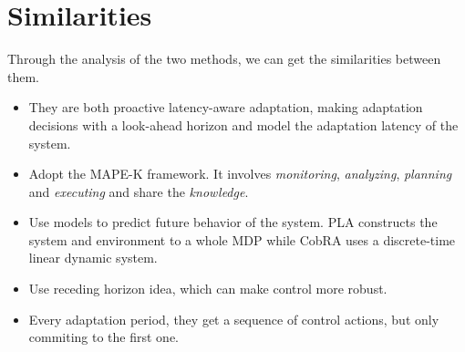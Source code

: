 \documentclass[sigconf]{acmart}
\begin{document}
\section{Similarities}
Through the analysis of the two methods, we can get the similarities between them. 
\begin{itemize}
	\item They are both proactive latency-aware adaptation, making adaptation decisions with a look-ahead horizon and model the adaptation latency of the system.
	\item Adopt the MAPE-K framework. It involves \textit{monitoring}, \textit{analyzing}, \textit{planning} and \textit{executing} and share the \textit{knowledge}. 
	\item Use models to predict future behavior of the system. PLA constructs the system and environment to a whole MDP while CobRA uses a discrete-time linear dynamic system.
	\item Use receding horizon idea, which can make control more robust.
	\item Every adaptation period, they get a sequence of control actions, but only commiting to the first one.
\end{itemize}
\end{document}
